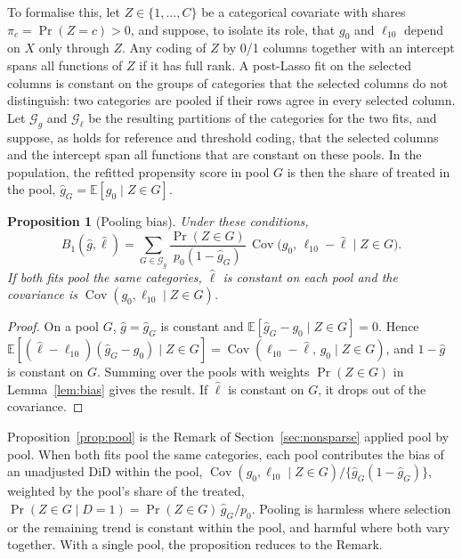 \documentclass[11pt]{article}
\providecommand{\E}{\mathbb{E}}
\newenvironment{ins}{\begin{leftbar}}{\end{leftbar}}
\theoremstyle{plain}
\newtheorem{proposition}[lemma]{Proposition}
\theoremstyle{remark}
\begin{document}
\begin{ins}

To formalise this, let $Z\in\{1,\dots,C\}$ be a categorical covariate with
shares $\pi_c=\Pr(Z=c)>0$, and suppose, to isolate its role, that $g_0$ and
$\ell_{10}$ depend on $X$ only through $Z$. Any coding of $Z$ by 0/1 columns
together with an intercept spans all functions of $Z$ if it has full rank. A
post-Lasso fit on the selected columns is constant on the groups of categories
that the selected columns do not distinguish: two categories are pooled if their
rows agree in every selected column. Let $\mathcal G_g$ and $\mathcal G_\ell$ be
the resulting partitions of the categories for the two fits, and suppose, as
holds for reference and threshold coding, that the selected columns and the
intercept span all functions that are constant on these pools. In the
population, the refitted propensity score in pool $G$ is then the share of
treated in the pool, $\hat g_G=\E[g_0\mid Z\in G]$.

\begin{proposition}[Pooling bias] %
Under these conditions,
\[
  B_1(\hat g,\hat\ell)=\sum_{G\in\mathcal G_g}\frac{\Pr(Z\in G)}{p_0(1-\hat g_G)}\,
  \operatorname{Cov}\big(g_0,\,\ell_{10}-\hat\ell\;\big|\;Z\in G\big).
\]
If both fits pool the same categories, $\hat\ell$ is constant on each pool and
the covariance is $\operatorname{Cov}(g_0,\ell_{10}\mid Z\in G)$.
\end{proposition}
\begin{proof}
On a pool $G$, $\hat g=\hat g_G$ is constant and
$\E[\hat g_G-g_0\mid Z\in G]=0$. Hence
$\E[(\hat\ell-\ell_{10})(\hat g_G-g_0)\mid Z\in G]
=\operatorname{Cov}(\ell_{10}-\hat\ell,\,g_0\mid Z\in G)$, and $1-\hat g$ is
constant on $G$. Summing over the pools with weights $\Pr(Z\in G)$ in
Lemma~\ref{lem:bias} gives the result. If $\hat\ell$ is constant on $G$, it
drops out of the covariance.
\end{proof}
Proposition~\ref{prop:pool} is the Remark of Section~\ref{sec:nonsparse} applied
pool by pool. When both fits pool the same categories, each pool contributes the
bias of an unadjusted DiD within the pool,
$\operatorname{Cov}(g_0,\ell_{10}\mid Z\in G)/\{\hat g_G(1-\hat g_G)\}$, weighted
by the pool's share of the treated,
$\Pr(Z\in G\mid D=1)=\Pr(Z\in G)\,\hat g_G/p_0$. Pooling is harmless where
selection or the remaining trend is constant within the pool, and harmful where
both vary together. With a single pool, the proposition reduces to the Remark.


\end{ins}
\end{document}

